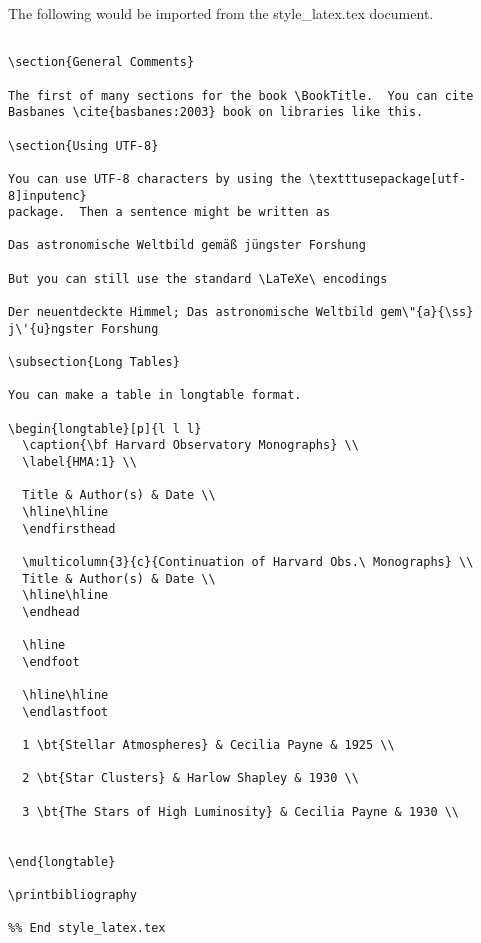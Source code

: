 The following would be imported from  the style\_latex.tex document.

\begin{verbatim}

\section{General Comments}

The first of many sections for the book \BookTitle.  You can cite 
Basbanes \cite{basbanes:2003} book on libraries like this.

\section{Using UTF-8}

You can use UTF-8 characters by using the \textttusepackage[utf-8]inputenc}
package.  Then a sentence might be written as

Das astronomische Weltbild gemäß jüngster Forshung

But you can still use the standard \LaTeXe\ encodings

Der neuentdeckte Himmel; Das astronomische Weltbild gem\"{a}{\ss} j\'{u}ngster Forshung

\subsection{Long Tables}

You can make a table in longtable format.

\begin{longtable}[p]{l l l}
  \caption{\bf Harvard Observatory Monographs} \\
  \label{HMA:1} \\

  Title & Author(s) & Date \\
  \hline\hline
  \endfirsthead

  \multicolumn{3}{c}{Continuation of Harvard Obs.\ Monographs} \\
  Title & Author(s) & Date \\
  \hline\hline
  \endhead

  \hline
  \endfoot
  
  \hline\hline
  \endlastfoot

  1 \bt{Stellar Atmospheres} & Cecilia Payne & 1925 \\

  2 \bt{Star Clusters} & Harlow Shapley & 1930 \\

  3 \bt{The Stars of High Luminosity} & Cecilia Payne & 1930 \\

  
\end{longtable}

\printbibliography

%% End style_latex.tex
\end{verbatim}

